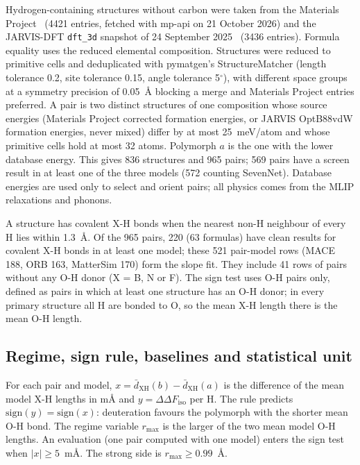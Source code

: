 \documentclass[aps,prmaterials,reprint,superscriptaddress,nofootinbib]{revtex4-2}
\newcommand{\ddF}{\Delta\Delta F_{\mathrm{iso}}}
\begin{document}
Hydrogen-containing structures without carbon were taken from the Materials Project~\cite{Jain2013} (4421 entries, fetched with mp-api on 21 October 2026) and the JARVIS-DFT \texttt{dft\_3d} snapshot of 24 September 2025~\cite{Choudhary2020} (3436 entries). Formula equality uses the reduced elemental composition. Structures were reduced to primitive cells and deduplicated with pymatgen's StructureMatcher (length tolerance 0.2, site tolerance 0.15, angle tolerance 5$^\circ$), with different space groups at a symmetry precision of 0.05~\AA{} blocking a merge and Materials Project entries preferred. A pair is two distinct structures of one composition whose source energies (Materials Project corrected formation energies, or JARVIS OptB88vdW formation energies, never mixed) differ by at most 25~meV/atom and whose primitive cells hold at most 32 atoms. Polymorph $a$ is the one with the lower database energy. This gives 836 structures and 965 pairs; 569 pairs have a screen result in at least one of the three models (572 counting SevenNet). Database energies are used only to select and orient pairs; all physics comes from the MLIP relaxations and phonons.

A structure has covalent X-H bonds when the nearest non-H neighbour of every H lies within 1.3~\AA. Of the 965 pairs, 220 (63 formulas) have clean results for covalent X-H bonds in at least one model; these 521 pair-model rows (MACE 188, ORB 163, MatterSim 170) form the slope fit. They include 41 rows of pairs without any O-H donor (X = B, N or F). The sign test uses O-H pairs only, defined as pairs in which at least one structure has an O-H donor; in every primary structure all H are bonded to O, so the mean X-H length there is the mean O-H length.

\subsection{Regime, sign rule, baselines and statistical unit}

For each pair and model, $x = \bar d_{\mathrm{XH}}(b) - \bar d_{\mathrm{XH}}(a)$ is the difference of the mean model X-H lengths in m\AA{} and $y = \ddF$ per H. The rule predicts $\mathrm{sign}(y) = \mathrm{sign}(x)$: deuteration favours the polymorph with the shorter mean O-H bond. The regime variable $r_{\max}$ is the larger of the two mean model O-H lengths. An evaluation (one pair computed with one model) enters the sign test when $|x| \geq 5$~m\AA. The strong side is $r_{\max} \geq 0.99$~\AA.
\end{document}
